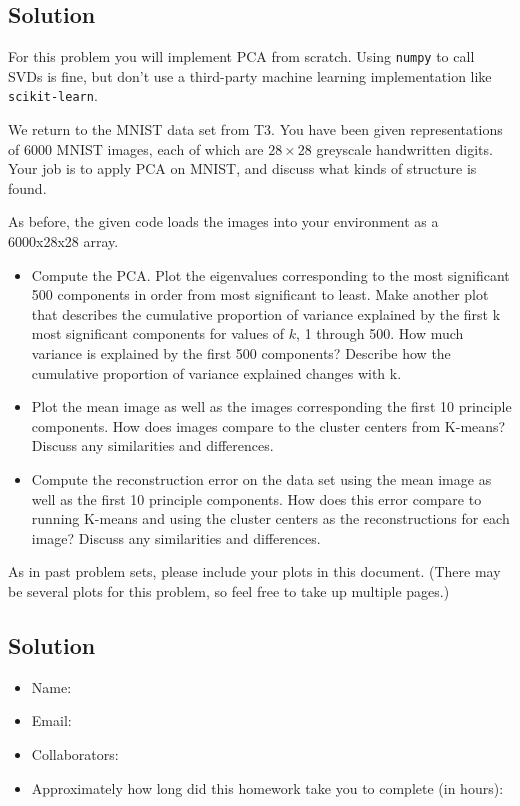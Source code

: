 \documentclass[submit]{harvardml}
\begin{document}
\subsection*{Solution}




\newpage

\begin{problem}

For this problem you will implement PCA from scratch.  Using
\texttt{numpy} to call SVDs is fine, but don't use a third-party
machine learning implementation like \texttt{scikit-learn}.

We return to the MNIST data set from T3.  You have been given
representations of 6000 MNIST images, each of which are $28\times28$
greyscale handwritten digits. Your job is to apply PCA on MNIST, and
discuss what kinds of structure is found.  

As before, the given code loads the images into your environment as a
6000x28x28 array.

\begin{itemize}

\item Compute the PCA.  Plot the eigenvalues corresponding to the most significant 500
  components in order from most significant to least. Make another plot that describes the cumulative proportion of variance explained by the first k most significant components for values of $k$, 1 through 500. 
  How much variance is explained by the first 500 components?  Describe
  how the cumulative proportion of variance explained changes with k.  

\item Plot the mean image as well as the images corresponding the
  first 10 principle components.  How does images compare to the
  cluster centers from K-means?  Discuss any similarities and
  differences.

\item Compute the reconstruction error on the data set using the mean
  image as well as the first 10 principle components.  How does this
  error compare to running K-means and using the cluster centers as
  the reconstructions for each image?  Discuss any similarities and
  differences.  

\end{itemize}


As in past problem sets, please include your plots in this
document. (There may be several plots for this problem, so feel free
to take up multiple pages.)




\end{problem}
\subsection*{Solution}


\newpage

\begin{itemize}
    \item Name:
    \item Email:
    \item Collaborators:
    \item Approximately how long did this homework take you to complete (in hours):   
\end{itemize}
\end{document}
